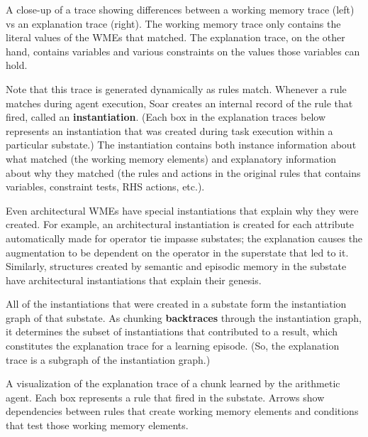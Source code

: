\vspace{12pt}
\begin{center}
	\captionsetup{type=figure}
	\centering{}
	\caption{A close-up of a trace showing differences between a working memory trace (left) vs an explanation trace (right).  The working memory trace only contains the literal values of the WMEs that matched.  The explanation trace, on the other hand, contains variables and various constraints on the values those variables can hold.}
	\label{fig:chunking-wm-vs-exp}
\end{center}

Note that this trace is generated dynamically as rules match.  Whenever a rule matches during agent execution, Soar creates an internal record of the rule that fired, called an \textbf{instantiation}.  (Each box in the explanation traces below represents an instantiation that was created during task execution within a particular substate.) The instantiation contains both instance information about what matched (the working memory elements) and explanatory information about why they matched (the rules and actions in the original rules that contains variables, constraint tests, RHS actions, etc.).  

Even architectural WMEs have special instantiations that explain why they were created.  For example, an architectural instantiation is created for each  attribute automatically made for operator tie impasse substates; the explanation causes the  augmentation to be dependent on the operator in the superstate that led to it.  Similarly, structures created by semantic and episodic memory in the substate have architectural instantiations that explain their genesis.

All of the instantiations that were created in a substate form the instantiation graph of that substate.  As chunking \textbf{backtraces} through the instantiation graph, it determines the subset of instantiations that contributed to a result, which constitutes the explanation trace for a learning episode.  (So, the explanation trace is a subgraph of the instantiation graph.)

\vspace{12pt}
\begin{center}
	\captionsetup{type=figure}
	\centering{}
	\caption{A visualization of the explanation trace of a chunk learned by the arithmetic agent.  Each box represents a rule that fired in the substate.  Arrows show dependencies between rules that create working memory elements and conditions that test those working memory elements.}
	\label{fig:chunking-trace}
\end{center}

